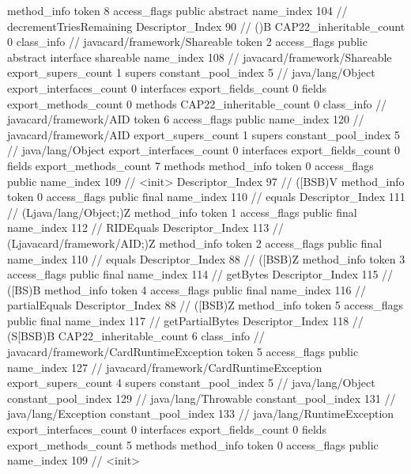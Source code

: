 {{{{{				}
				method_info {
					token	8
					access_flags	public abstract
					name_index	104		// decrementTriesRemaining
					Descriptor_Index	90		// ()B
				}
			}
			CAP22_inheritable_count	0
		}
		class_info {		// javacard/framework/Shareable
			token	2
			access_flags	public abstract interface shareable
			name_index	108		// javacard/framework/Shareable
			export_supers_count	1
			supers {
				constant_pool_index	5		// java/lang/Object
			}
			export_interfaces_count	0
			interfaces {
			}
			export_fields_count	0
			fields {
			}
			export_methods_count	0
			methods {
			}
			CAP22_inheritable_count	0
		}
		class_info {		// javacard/framework/AID
			token	6
			access_flags	public
			name_index	120		// javacard/framework/AID
			export_supers_count	1
			supers {
				constant_pool_index	5		// java/lang/Object
			}
			export_interfaces_count	0
			interfaces {
			}
			export_fields_count	0
			fields {
			}
			export_methods_count	7
			methods {
				method_info {
					token	0
					access_flags	public
					name_index	109		// <init>
					Descriptor_Index	97		// ([BSB)V
				}
				method_info {
					token	0
					access_flags	public final
					name_index	110		// equals
					Descriptor_Index	111		// (Ljava/lang/Object;)Z
				}
				method_info {
					token	1
					access_flags	public final
					name_index	112		// RIDEquals
					Descriptor_Index	113		// (Ljavacard/framework/AID;)Z
				}
				method_info {
					token	2
					access_flags	public final
					name_index	110		// equals
					Descriptor_Index	88		// ([BSB)Z
				}
				method_info {
					token	3
					access_flags	public final
					name_index	114		// getBytes
					Descriptor_Index	115		// ([BS)B
				}
				method_info {
					token	4
					access_flags	public final
					name_index	116		// partialEquals
					Descriptor_Index	88		// ([BSB)Z
				}
				method_info {
					token	5
					access_flags	public final
					name_index	117		// getPartialBytes
					Descriptor_Index	118		// (S[BSB)B
				}
			}
			CAP22_inheritable_count	6
		}
		class_info {		// javacard/framework/CardRuntimeException
			token	5
			access_flags	public
			name_index	127		// javacard/framework/CardRuntimeException
			export_supers_count	4
			supers {
				constant_pool_index	5		// java/lang/Object
				constant_pool_index	129		// java/lang/Throwable
				constant_pool_index	131		// java/lang/Exception
				constant_pool_index	133		// java/lang/RuntimeException
			}
			export_interfaces_count	0
			interfaces {
			}
			export_fields_count	0
			fields {
			}
			export_methods_count	5
			methods {
				method_info {
					token	0
					access_flags	public
					name_index	109		// <init>
}}}}}
